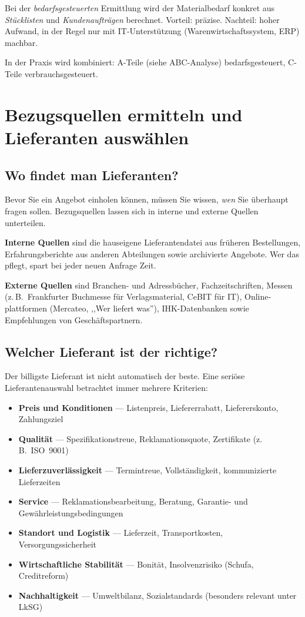 \documentclass[11pt, a4paper]{article}
\begin{document}
Bei der \emph{bedarfsgesteuerten} Ermittlung wird der Materialbedarf konkret aus
\emph{Stücklisten} und \emph{Kundenaufträgen} berechnet. Vorteil: präzise. Nachteil:
hoher Aufwand, in der Regel nur mit IT-Unterstützung (Warenwirtschafts­system, ERP)
machbar.

In der Praxis wird kombiniert: A-Teile (siehe ABC-Analyse) bedarfsgesteuert, C-Teile
verbrauchsgesteuert.

\section{Bezugsquellen ermitteln und Lieferanten auswählen}

\subsection{Wo findet man Lieferanten?}

Bevor Sie ein Angebot einholen können, müssen Sie wissen, \emph{wen} Sie überhaupt
fragen sollen. Bezugsquellen lassen sich in interne und externe Quellen unterteilen.

\textbf{Interne Quellen} sind die hauseigene Lieferantendatei aus früheren Bestellungen,
Erfahrungs­berichte aus anderen Abteilungen sowie archivierte Angebote. Wer das pflegt,
spart bei jeder neuen Anfrage Zeit.

\textbf{Externe Quellen} sind Branchen- und Adressbücher, Fach­zeitschriften, Messen
(z.\,B.\ Frankfurter Buchmesse für Verlagsmaterial, CeBIT für IT), Online­plattformen
(Mercateo, ,,Wer liefert was''), IHK-Datenbanken sowie Empfehlungen von Geschäfts­partnern.

\subsection{Welcher Lieferant ist der richtige?}

Der billigste Lieferant ist nicht automatisch der beste. Eine seriöse Lieferanten\-auswahl
betrachtet immer mehrere Kriterien:

\begin{itemize}[itemsep=0pt]
  \item \textbf{Preis und Konditionen} --- Listenpreis, Liefererrabatt, Liefererskonto, Zahlungsziel
  \item \textbf{Qualität} --- Spezifikationstreue, Reklamationsquote, Zertifikate (z.\,B.\ ISO~9001)
  \item \textbf{Lieferzuverlässigkeit} --- Termintreue, Vollständigkeit, kommunizierte Lieferzeiten
  \item \textbf{Service} --- Reklamationsbearbeitung, Beratung, Garantie- und Gewährleistungsbedingungen
  \item \textbf{Standort und Logistik} --- Lieferzeit, Transportkosten, Versorgungssicherheit
  \item \textbf{Wirtschaftliche Stabilität} --- Bonität, Insolvenzrisiko (Schufa, Creditreform)
  \item \textbf{Nachhaltigkeit} --- Umwelt­bilanz, Sozial­standards (besonders relevant unter LkSG)
\end{itemize}
\end{document}
